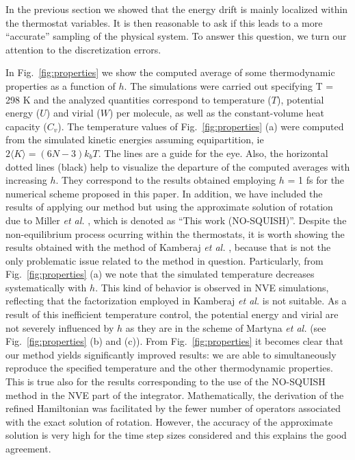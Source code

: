 \documentclass[
journal=jctcce,
layout=twocolumn
]{achemso}
\newcommand{\timestep}{h}
\begin{document}
In the previous section we showed that the energy drift is mainly localized within the thermostat variables.
It is then reasonable to ask if this leads to a more ``accurate'' sampling of the physical system.
To answer this question, we turn our attention to the discretization errors.

In Fig.~\ref{fig:properties} we show the computed average of some thermodynamic properties as a function of $h$. The simulations were carried out specifying T = 298 K and the analyzed quantities correspond to temperature ($T$), potential energy ($U$) and virial ($W$) per molecule, as well as the constant-volume heat capacity ($C_v$).
The temperature values of Fig.~\ref{fig:properties} (a) were computed from the simulated kinetic energies assuming equipartition, ie $2 \langle K \rangle = (6N -3) k_b T$.
The lines are a guide for the eye. 
Also, the horizontal dotted lines (black) help to visualize the departure of the computed averages with increasing $\timestep$.
They correspond to the results obtained employing $h$ = 1 fs for the numerical scheme proposed in this paper.
In addition, we have included the results of applying our method but using the approximate solution of rotation due to Miller \textit{et al.} \cite{Miller_2002}, which is denoted as ``This work (NO-SQUISH)''.
Despite the non-equilibrium process ocurring within the thermostats, it is worth showing the results obtained with the method of Kamberaj \textit{et al.} \cite{Kamberaj_2005}, because that is not the only problematic issue related to the method in question.
Particularly, from Fig.~\ref{fig:properties} (a) we note that the simulated temperature decreases systematically with $\timestep$.
This kind of behavior is observed in NVE simulations\cite{Davidchack_2009,Silveira_2017}, reflecting that the factorization employed in Kamberaj \textit{et al.} \cite{Kamberaj_2005} is not suitable. 
As a result of this inefficient temperature control, the potential energy and virial are not severely influenced by $\timestep$ as they are in the scheme of Martyna \textit{et al.} \cite{Martyna_1996} (see Fig.~\ref{fig:properties} (b) and (c)).
From Fig.~\ref{fig:properties} it becomes clear that our method yields significantly improved results: we are able to simultaneously reproduce the specified temperature and the other thermodynamic properties. 
This is true also for the results corresponding to the use of the NO-SQUISH method\cite{Miller_2002} in the NVE part of the integrator.
Mathematically, the derivation of the refined Hamiltonian was facilitated by the fewer number of operators associated with the exact solution of rotation.
However, the accuracy of the approximate solution is very high for the time step sizes considered\cite{Silveira_2017} and this explains the good agreement.
\end{document}

